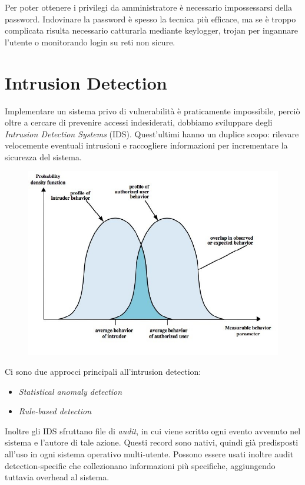\documentclass[a4paper, 11pt, notitlepage, fleqn]{report}
\begin{document}
Per poter ottenere i privilegi da amministratore è necessario impossessarsi della password. Indovinare la password è spesso la tecnica più efficace, ma se è troppo complicata risulta necessario catturarla mediante keylogger, trojan per ingannare l'utente o monitorando login su reti non sicure.

\section{Intrusion Detection}
Implementare un sistema privo di vulnerabilità è praticamente impossibile, perciò oltre a cercare di prevenire accessi indesiderati, dobbiamo sviluppare degli \emph{Intrusion Detection Systems} (IDS). Quest'ultimi hanno un duplice scopo: rilevare velocemente eventuali intrusioni e raccogliere informazioni per incrementare la sicurezza del sistema.

\begin{figure}[htp]
	\centering
	\includegraphics[width=.8\textwidth]{images/IDSprinciples}
\end{figure}

\noindent
Ci sono due approcci principali all'intrusion detection:
\begin{itemize}
	\item \emph{Statistical anomaly detection}
	\item \emph{Rule-based detection}
\end{itemize}
Inoltre gli IDS sfruttano file di \emph{audit}, in cui viene scritto ogni evento avvenuto nel sistema e l'autore di tale azione. Questi record sono nativi, quindi già predisposti all'uso in ogni sistema operativo multi-utente. Possono essere usati inoltre audit detection-specific che collezionano informazioni più specifiche, aggiungendo tuttavia overhead al sistema.
\end{document}
